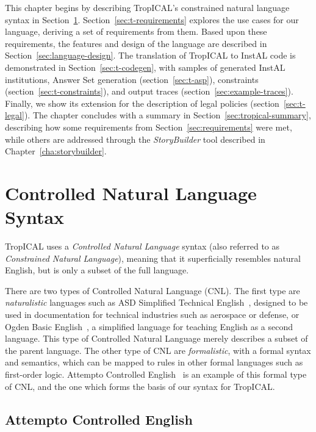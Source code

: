 \documentclass[11pt]{report}
\begin{document}
This chapter begins by describing TropICAL's constrained natural
language syntax in Section~\ref{sec:t-constrained}.
Section~\ref{sec:t-requirements} explores the use cases for our language, deriving
a set of requirements from them. Based upon these requirements, the features and
design of the language are described in Section~\ref{sec:language-design}.
The translation of TropICAL to InstAL code is demonstrated in Section~\ref{sec:t-codegen}, with samples of generated InstAL
institutions, Answer Set
generation (section~\ref{sec:t-asp}), constraints
(section~\ref{sec:t-constraints}), and output traces (section~\ref{sec:example-traces}). Finally, we show its extension for
the description of legal policies (section~\ref{sec:t-legal}). The chapter
concludes with a summary in Section~\ref{sec:tropical-summary}, describing how
some requirements from Section~\ref{sec:requirements} were met, while others are
addressed through the \emph{StoryBuilder} tool described in Chapter~\ref{cha:storybuilder}.


\section{Controlled Natural Language Syntax}
\label{sec:t-constrained}

TropICAL uses a \emph{Controlled Natural Language} syntax (also referred to as
\emph{Constrained Natural Language}), meaning that it superficially
resembles natural English, but is only a subset of the full language.

There are two types of Controlled Natural Language (CNL). The first type are \emph{naturalistic} languages
such as ASD Simplified Technical English~\citep{asd2007simplified}, designed to
be used in documentation for technical industries such as aerospace or defense,
or Ogden Basic English~\citep{ogden1944basic}, a simplified language for teaching
English as a second language. This type of Controlled Natural Language merely
describes a subset of the parent language. The other type of CNL are
\emph{formalistic}, with a formal
syntax and semantics, which can be mapped to rules in other formal languages
such as first-order logic. Attempto Controlled English~\citep{fuchs1996attempto}
is an example of this formal type of CNL, and the one which forms the basis of
our syntax for TropICAL.

\subsection{Attempto Controlled English}
\end{document}
